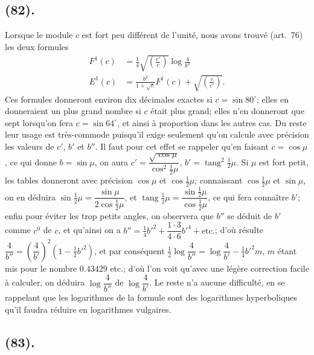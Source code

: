 \documentclass{article}
\begin{document}
\subsection*{(82).}

Lorsque le module $c$ est fort peu différent de l'unité, nous avons trouvé (art.~76) les deux formules
\[ \begin{aligned} F^{1}(c)&=\tfrac{1}{4}\sqrt{\left(\frac{c'}{c}\right)}\log\frac{4}{b''}\\ E^{1}(c)&=\frac{b^{2}}{1+\sqrt{c}}F^{1}(c)+\sqrt{\left(\frac{c}{c'}\right)}. \end{aligned} \]
Ces formules donneront environ dix décimales exactes si $c=\sin 80^{\circ}$; elles en donneraient un plus grand nombre si $c$ était plus grand; elles n'en donneront que sept lorsqu'on fera $c=\sin 64^{\circ}$, et ainsi à proportion dans les autres cas. Du reste leur usage est très-commode puisqu'il exige seulement qu'on calcule avec précision les valeurs de $c'$, $b'$ et $b''$. Il faut pour cet effet se rappeler qu'en faisant $c=\cos\mu$, ce qui donne $b=\sin\mu$, on aura $c'=\dfrac{\sqrt{\cos\mu}}{\cos^{2}\frac{1}{2}\mu}$, $b'=\operatorname{tang}^{2}\frac{1}{2}\mu$. Si $\mu$ est fort petit, les tables donneront avec précision $\cos\mu$ et $\cos\frac{1}{2}\mu$; connaissant $\cos\frac{1}{2}\mu$ et $\sin\mu$, on en déduira $\sin\frac{1}{2}\mu=\dfrac{\sin\mu}{2\cos\frac{1}{2}\mu}$, et $\operatorname{tang}\frac{1}{2}\mu=\dfrac{\sin\frac{1}{2}\mu}{\cos\frac{1}{2}\mu}$, ce qui fera connaître $b'$; enfin pour éviter les trop petits angles, on observera que $b''$ se déduit de $b'$ comme $c^{0}$ de $c$, et qu'ainsi on a $b''=\frac{1}{4}b'^{2}+\dfrac{1\cdot 3}{4\cdot 6}b'^{4}+\text{etc.}$; d'où résulte $\dfrac{4}{b''}=\left(\dfrac{4}{b'}\right)^{2}(1-\frac{1}{2}b'^{2})$, et par conséquent $\frac{1}{2}\log\dfrac{4}{b''}=\log\dfrac{4}{b'}-\frac{1}{4}b'^{2}m$, $m$ étant mis pour le nombre $0.43429$ etc.; d'où l'on voit qu'avec une légère correction facile à calculer, on déduira $\log\dfrac{4}{b''}$ de $\log\dfrac{4}{b'}$. Le reste n'a aucune difficulté, en se rappelant que les logarithmes de la formule sont des logarithmes hyperboliques qu'il faudra réduire en logarithmes vulgaires.

\subsection*{(83).}
\end{document}
